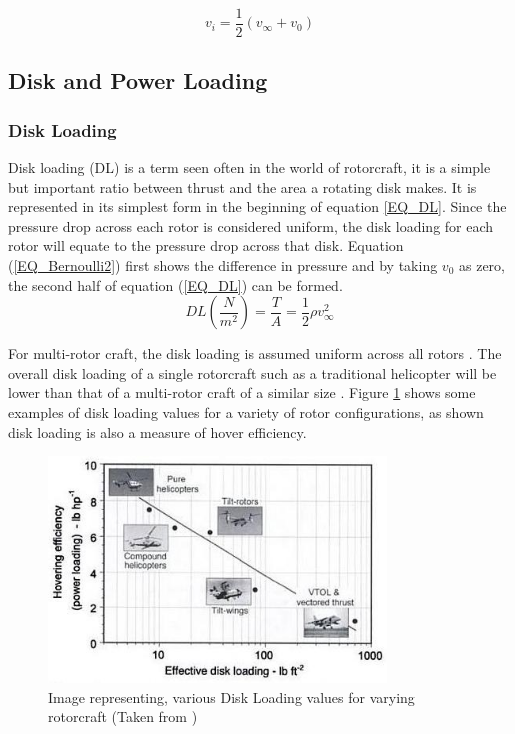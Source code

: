 \begin{equation}
\label{EQ_RotorVelocity}
v_i = \frac{1}{2} (v_\infty + v_0)
\end{equation}

\subsection{Disk and Power Loading}
\subsubsection{Disk Loading}
Disk loading (DL) is a term seen often in the world of rotorcraft, it is a simple but important ratio between thrust and the area a rotating disk makes.  It is represented in its simplest form in the beginning of equation \eqref{EQ_DL}. Since the pressure drop across each rotor is considered uniform, the disk loading for each rotor will equate to the pressure drop across that disk. Equation (\ref{EQ_Bernoulli2}) first shows the difference in pressure and by taking $v_0$ as zero, the second half of equation (\ref{EQ_DL}) can be formed. 
\begin{equation}
\label{EQ_DL}
DL (\frac{N}{m^{2}})= \frac{T}{A} = \frac{1}{2} \rho v_\infty^2
\end{equation}

For multi-rotor craft, the disk loading is assumed uniform across all rotors \cite{Leishman}. The overall disk loading of a single rotorcraft such as a traditional helicopter will be lower than that of a multi-rotor craft of a similar size \cite{RotorCraftHand}.  Figure \ref{IM_DL} shows some examples of disk loading values for a variety of rotor configurations, as shown disk loading is also a measure of hover efficiency.

\begin{figure}[H]
\centering
\includegraphics[height = 6cm]{Images/Literature/DL}     
\caption{Image representing, various Disk Loading values for varying rotorcraft (Taken from \cite{Leishman})}
\label{IM_DL}
\end{figure}

